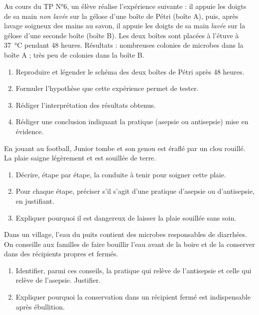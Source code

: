 \documentclass[11pt]{article}
\begin{document}
\begin{exercice}
Au cours du TP N°6, un élève réalise l'expérience suivante : il appuie les doigts de sa main \emph{non lavée} sur la gélose d'une boîte de Pétri (boîte A), puis, après lavage soigneux des mains au savon, il appuie les doigts de sa main \emph{lavée} sur la gélose d'une seconde boîte (boîte B). Les deux boîtes sont placées à l'étuve à \SI{37}{\celsius} pendant 48 heures. Résultats : nombreuses colonies de microbes dans la boîte A ; très peu de colonies dans la boîte B.
\begin{enumerate}
\item Reproduire et légender le schéma des deux boîtes de Pétri après 48 heures.
\item Formuler l'hypothèse que cette expérience permet de tester.
\item Rédiger l'interprétation des résultats obtenus.
\item Rédiger une conclusion indiquant la pratique (asepsie ou antisepsie) mise en évidence.
\end{enumerate}
\end{exercice}

\begin{exercice}
En jouant au football, Junior tombe et son genou est éraflé par un clou rouillé. La plaie saigne légèrement et est souillée de terre.
\begin{enumerate}
\item Décrire, étape par étape, la conduite à tenir pour soigner cette plaie.
\item Pour chaque étape, préciser s'il s'agit d'une pratique d'asepsie ou d'antisepsie, en justifiant.
\item Expliquer pourquoi il est dangereux de laisser la plaie souillée sans soin.
\end{enumerate}
\end{exercice}

\begin{exercice}
Dans un village, l'eau du puits contient des microbes responsables de diarrhées. On conseille aux familles de faire bouillir l'eau avant de la boire et de la conserver dans des récipients propres et fermés.
\begin{enumerate}
\item Identifier, parmi ces conseils, la pratique qui relève de l'antisepsie et celle qui relève de l'asepsie. Justifier.
\item Expliquer pourquoi la conservation dans un récipient fermé est indispensable après ébullition.
\end{enumerate}
\end{exercice}
\end{document}
